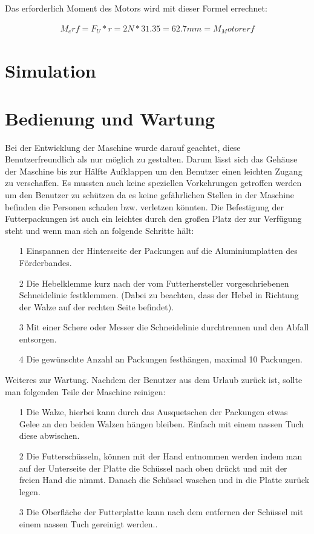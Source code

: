 Das erforderlich Moment des Motors wird mit dieser Formel errechnet:

\begin{align*}
M_erf=F_U*r=2N*31.35=62.7mm=M_Motorerf
\end{align*}

\section{Simulation}

	
\section{Bedienung und Wartung}

Bei der Entwicklung der Maschine wurde darauf geachtet, diese Benutzerfreundlich als nur möglich zu gestalten. Darum lässt sich das Gehäuse der Maschine bis zur Hälfte Aufklappen um den Benutzer einen leichten Zugang zu verschaffen. Es mussten auch keine speziellen Vorkehrungen getroffen werden um den Benutzer zu schützen da es keine gefährlichen Stellen in der Maschine befinden die Personen schaden bzw. verletzen könnten. Die Befestigung der Futterpackungen ist auch ein leichtes durch den großen Platz der zur Verfügung steht und wenn man sich an folgende Schritte hält: 

\begin{itemize}
\item[1] Einspannen der Hinterseite der Packungen auf die Aluminiumplatten des Förderbandes. 
\item[2] Die Hebelklemme kurz nach der vom Futterhersteller vorgeschriebenen Schneidelinie festklemmen. (Dabei zu beachten, dass der Hebel in Richtung der Walze auf der rechten Seite befindet).
\item[3] Mit einer Schere oder Messer die Schneidelinie durchtrennen und den Abfall entsorgen.
\item[4] Die gewünschte Anzahl an Packungen festhängen, maximal 10 Packungen.
\end{itemize} 

Weiteres zur Wartung. Nachdem der Benutzer aus dem Urlaub zurück ist, sollte man folgenden Teile der Maschine reinigen: 

\begin{itemize}
\item[1] Die Walze, hierbei kann durch das Ausquetschen der Packungen etwas Gelee an den beiden Walzen hängen bleiben. Einfach mit einem nassen Tuch diese abwischen.
\item[2] Die Futterschüsseln, können mit der Hand entnommen werden indem man auf der Unterseite der Platte die Schüssel nach oben drückt und mit der freien Hand die nimmt. Danach die Schüssel waschen und in die Platte zurück legen.
\item[3] Die Oberfläche der Futterplatte kann nach dem entfernen der Schüssel mit einem nassen Tuch gereinigt werden..
\end{itemize}



